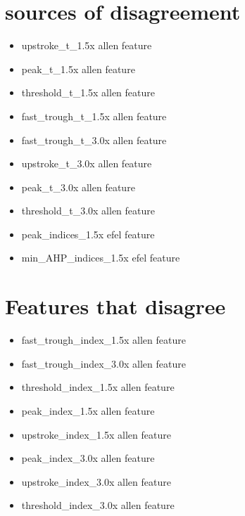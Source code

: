 \section{sources of disagreement}
\begin{itemize}
    \item upstroke\_t\_1.5x allen feature
    \item  peak\_t\_1.5x allen feature
    \item threshold\_t\_1.5x allen feature
    \item fast\_trough\_t\_1.5x allen feature
    \item fast\_trough\_t\_3.0x allen feature
    \item upstroke\_t\_3.0x allen feature
    \item peak\_t\_3.0x allen feature
    \item threshold\_t\_3.0x allen feature
    \item peak\_indices\_1.5x efel feature
    \item min\_AHP\_indices\_1.5x efel feature
\end{itemize}



\section{Features that disagree} 
\begin{itemize}

    \item fast\_trough\_index\_1.5x allen feature
    \item fast\_trough\_index\_3.0x allen feature
    \item threshold\_index\_1.5x allen feature
    \item peak\_index\_1.5x allen feature
    \item upstroke\_index\_1.5x allen feature
    \item peak\_index\_3.0x allen feature
    \item upstroke\_index\_3.0x allen feature
    \item threshold\_index\_3.0x allen feature
\end{itemize}


